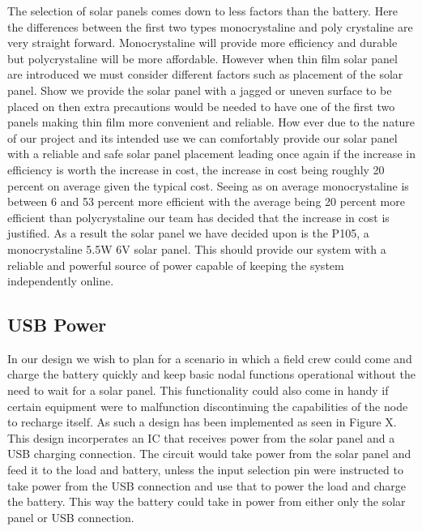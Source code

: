 The selection of solar panels comes down to less factors than the battery. Here the differences between the first two types monocrystaline and poly crystaline are very straight forward. Monocrystaline will provide more efficiency and durable but polycrystaline will be more affordable. However when thin film solar panel are introduced we must consider different factors such as placement of the solar panel. Show we provide the solar panel with a jagged or uneven surface to be placed on then extra precautions would be needed to have one of the first two panels making thin film more convenient and reliable. How ever due to the nature of our project and its intended use we can comfortably provide our solar panel with a reliable and safe solar panel placement leading once again if the increase in efficiency is worth the increase in cost, the increase in cost being roughly 20 percent on average given the typical cost. Seeing as on average monocrystaline is between 6 and 53 percent more efficient with the average being 20 percent more efficient than polycrystaline our team has decided that the increase in cost is justified. As a result the solar panel we have decided upon is the P105, a monocrystaline 5.5W 6V solar panel. This should provide our system with a reliable and powerful source of power capable of keeping the system independently online.


\subsection{USB Power}
In our design we wish to plan for a scenario in which a field crew could come and charge the battery quickly and keep basic nodal functions operational without the need to wait for a solar panel. This functionality could also come in handy if certain equipment were to malfunction discontinuing the capabilities of the node to recharge itself. As such a design has been implemented as seen in Figure X. This design incorperates an IC that receives power from the solar panel and a USB charging connection. The circuit would take power from the solar panel and feed it to the load and battery, unless the input selection pin were instructed to take power from the USB connection and use that to power the load and charge the battery. This way the battery could take in power from either only the solar panel or USB connection.

